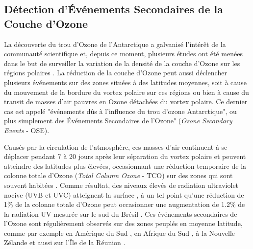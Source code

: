 \subsection{Détection d'Événements Secondaires de la Couche d'Ozone}

La découverte du trou d'Ozone de l'Antarctique \cite{Farman1985} a galvanisé l'intérêt de la communauté scientifique et, depuis ce moment, plusieurs études ont été menées dans le but de surveiller la variation de la densité de la couche d'Ozone sur les régions polaires \cite{Solomon1999}\cite{Salby2012}. La réduction de la couche d'Ozone peut aussi déclencher plusieurs événements sur des zones situées à des latitudes moyennes, soit à cause du mouvement de la bordure du vortex polaire sur ces régions  \cite{Kirchhoff1997}\cite{Marchand2005} ou bien à cause du transit de masses d'air pauvres en Ozone détachées du vortex polaire. Ce dernier cas est appelé "événements dûs à l'influence du trou d'ozone Antarctique", ou plus simplement des Événements Secondaires de l'Ozone" (\textit{Ozone Secondary Events}  - OSE). 

Causés par la circulation de l'atmosphère, ces masses d'air continuent à se déplacer pendant 7 à 20 jours après leur séparation du vortex polaire et peuvent atteindre des latitudes plus élevées, occasionnant une réduction temporaire de la colonne totale d'Ozone (\textit{Total Column Ozone} - TCO) sur des zones qui sont souvent habitées \cite{Prather1990}\cite{Waugh1994}\cite{Manney1994}. Comme résultat, des niveaux élevés de radiation ultraviolet nocive (UVB et UVC) atteignent la surface \cite{Casiccia2008}, à un tel point qu'une réduction de 1\% de la colonne totale d'Ozone peut occasionner une augmentation de 1.2\% de la radiation UV mesurée sur le sud du Brésil \cite{Guarnieri2004}. Ces événements secondaires de l'Ozone sont régulièrement observés sur des zones peuplés en moyenne latitude, comme par exemple en Amérique du Sud \cite{Kirschhoff1996}\cite{Pinheiro2011}, en Afrique du Sud \cite{Semane2006}\cite{Sivakumar2007}, à la Nouvelle Zélande \cite{Brinksma1998} et aussi sur l'Île de la Réunion \cite{toihir2015}. 


